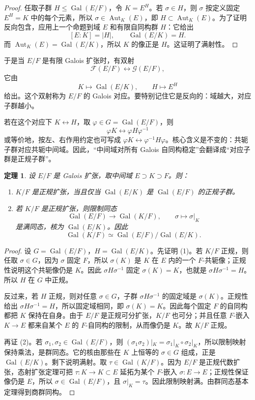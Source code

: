 \documentclass[11pt,a4paper,openany]{ctexbook}
\numberwithin{equation}{chapter}
\newcommand{\Gal}{\operatorname{Gal}}
\theoremstyle{plain}
\newtheorem{theorem}{定理}[chapter]
\theoremstyle{definition}
\theoremstyle{remark}
\begin{document}
\begin{proof}
任取子群 $H\le \Gal(E/F)$，令 $K=E^H$。若 $\sigma\in H$，则 $\sigma$ 按定义固定 $E^H=K$ 中的每个元素，所以 $\sigma\in \operatorname{Aut}_K(E)$，即 $H\subset \operatorname{Aut}_K(E)$。为了证明反向包含，应用上一个命题到域 $E$ 和有限自同构群 $H$：它给出
\[
[E:K]=|H|,\qquad \Gal(E/K)=H.
\]
而 $\operatorname{Aut}_K(E)=\Gal(E/K)$，所以 $K$ 的像正是 $H$。这证明了满射性。
\end{proof}

于是当 $E/F$ 是有限 Galois 扩张时，有双射
\[
\mathcal F(E/F)\longleftrightarrow \mathcal G(E/F),
\]
它由
\[
K\longmapsto \Gal(E/K),\qquad H\longmapsto E^H
\]
给出。这个双射称为 $E/F$ 的 Galois 对应。要特别记住它是反向的：域越大，对应子群越小。

若在这个对应下 $K\leftrightarrow H$，取 $\varphi\in G=\Gal(E/F)$，则
\[
\varphi K\leftrightarrow \varphi H\varphi^{-1}
\]
或等价地，按左、右作用约定也可写成 $\varphi K\leftrightarrow \varphi^{-1}H\varphi$。核心含义是不变的：共轭子群对应共轭中间域。因此，“中间域对所有 Galois 自同构稳定”会翻译成“对应子群是正规子群”。

\begin{theorem}
设 $E/F$ 是 Galois 扩张，取中间域 $E\supset K\supset F$。则：
\begin{enumerate}[label=(\arabic*)]
\item $K/F$ 是正规扩张，当且仅当 $\Gal(E/K)$ 是 $\Gal(E/F)$ 的正规子群。
\item 若 $K/F$ 是正规扩张，则限制同态
\[
\Gal(E/F)\longrightarrow \Gal(K/F),\qquad
\sigma\longmapsto \sigma|_K
\]
是满同态，核为 $\Gal(E/K)$。因此
\[
\Gal(K/F)\simeq \Gal(E/F)/\Gal(E/K).
\]
\end{enumerate}
\end{theorem}

\begin{proof}
设 $G=\Gal(E/F)$，$H=\Gal(E/K)$。先证明 (1)。若 $K/F$ 正规，则任取 $\sigma\in G$，因为 $\sigma$ 固定 $F$，所以 $\sigma(K)$ 是 $K$ 在 $E$ 内的一个 $F$-共轭像；正规性说明这个共轭像仍是 $K$。因此 $\sigma H\sigma^{-1}$ 固定 $\sigma(K)=K$，也就是 $\sigma H\sigma^{-1}=H$。所以 $H$ 在 $G$ 中正规。

反过来，若 $H$ 正规，则对任意 $\sigma\in G$，子群 $\sigma H\sigma^{-1}$ 的固定域是 $\sigma(K)$。正规性给出 $\sigma H\sigma^{-1}=H$，所以固定域相同，即 $\sigma(K)=K$。因此每个固定 $F$ 的自同构都把 $K$ 保持在自身。由于 $E/F$ 是正规可分扩张，$K/F$ 也可分；并且任意 $F$-嵌入 $K\to E$ 都来自某个 $E$ 的 $F$-自同构的限制，从而像仍是 $K$。故 $K/F$ 正规。

再证 (2)。若 $\sigma_1,\sigma_2\in\Gal(E/F)$，则 $(\sigma_1\sigma_2)|_K=\sigma_1|_K\circ\sigma_2|_K$，所以限制映射保持乘法，是群同态。它的核由那些在 $K$ 上恒等的 $\sigma\in G$ 组成，正是 $\Gal(E/K)$。剩下说明满射。取 $\tau\in\Gal(K/F)$。因为 $E/F$ 是正规代数扩张，态射扩张定理可把 $\tau:K\to K\subset E$ 延拓为某个 $F$-嵌入 $\sigma:E\to E$；正规性保证像仍是 $E$，所以 $\sigma\in\Gal(E/F)$，且 $\sigma|_K=\tau$。因此限制映射满。由群同态基本定理得到商群同构。
\end{proof}
\end{document}
